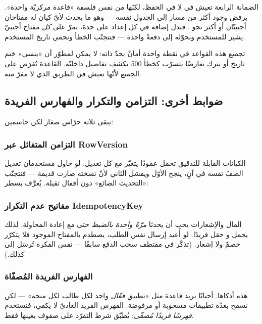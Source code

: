 \begin{idea}
الضمانة الرابعة تعيش في  لا في الحفظ، لكنّها من نفس فلسفة «قاعدة
مركزيّة واحدة». يرفض  وجود أكثر من مسار  إلى الجدول نفسه —
وهو ما يحدث لأيّ كيان له مفتاحان أجنبيّان أو أكثر نحو . فبدل إضافة
 في كل إعداد على حدة، نمرّ على \emph{كل} مفتاح أجنبيّ يشير للمستخدم ونحوّله
إلى  دفعةً واحدة — فنتجنّب الخطأ ونحمي تاريخ المستخدم.
\end{idea}

\begin{secnote}
تجميع هذه القواعد في نقطة واحدة أمانٌ بحدّ ذاته: لا يمكن لمطوّر أن «ينسى» ختم تاريخ أو
يترك تعارضًا يتسرّب كخطأ 500 يكشف تفاصيل داخليّة. القاعدة تُفرَض على الجميع لأنّها تعيش في
الطريق الذي لا مفرّ منه.
\end{secnote}

\subsection{ضوابط أخرى: التزامن والتكرار والفهارس الفريدة}

يبقى ثلاثة حرّاس صغار لكن حاسمين:

\subsubsection{التزامن المتفائل عبر RowVersion}
الكيانات القابلة للتدقيق تحمل عمودًا  يتغيّر مع كل تعديل. لو حاول
مستخدمان تعديل الصفّ نفسه في آنٍ، ينجح الأوّل ويفشل الثاني لأنّ نسخته صارت قديمة — فنتجنّب
«التحديث الضائع» دون أقفال ثقيلة. يُعرَّف بسطر:

\subsubsection{مفاتيح عدم التكرار IdempotencyKey}
المال والإشعارات يجب أن يحدثا \emph{مرّةً واحدة بالضبط} حتى مع إعادة المحاولة. لذلك يحمل
 و حقل  فريدًا. لو أُعيد إرسال نفس
الطلب، يصطدم بالمفتاح الموجود فلا يتكرّر خصمٌ ولا إشعار. (تذكّر  في
مقتطف سحب الدفع سابقًا — نفس الفكرة تُرسَل إلى  كذلك.)

\subsubsection{الفهارس الفريدة المُصفّاة}
هذه أذكاها. أحيانًا نريد قاعدة مثل «تطبيق \emph{فعّال} واحد لكل طالب لكل منحة» — لكن نسمح
بعدّة تطبيقات مسحوبة أو مرفوضة. الفهرس الفريد العاديّ لا يكفي، فنستخدم \emph{فهرسًا فريدًا
مُصفّى}: يُطبّق شرط التفرّد على صفوف بعينها فقط.

